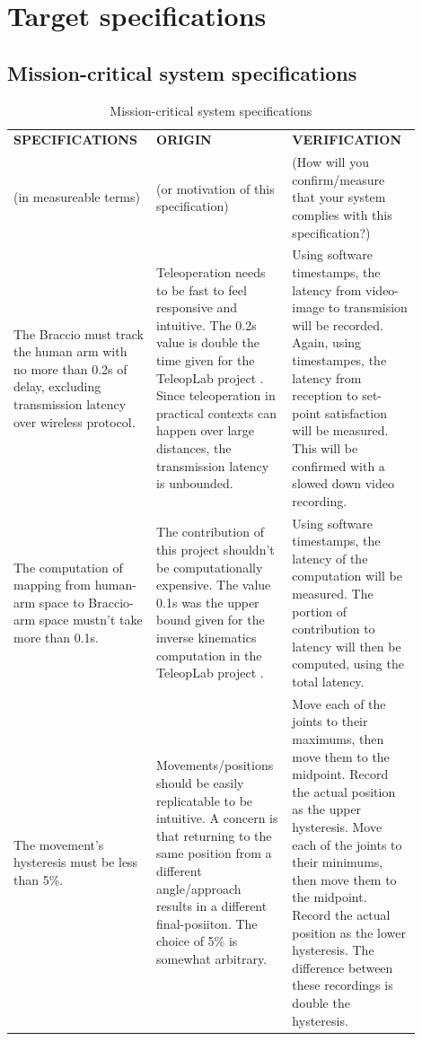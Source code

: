 \chapter{Target specifications}
\label{ch:target_specifications}

\section{Mission-critical system specifications}
\label{sec:mission_critical}

\begin{table}[h!]
\center
\begin{tabular}{|p{0.3\linewidth}|p{0.3\linewidth}|p{0.3\linewidth}|}
    \hline
    \textbf{SPECIFICATIONS} & \textbf{ORIGIN} & \textbf{VERIFICATION} \\
    (in measureable terms) & (or motivation of this specification) & (How will you confirm/measure that your system complies with this specification?) \\
    \hline
    The Braccio must track the human arm with no more than 0.2s of delay, excluding transmission latency over wireless protocol. & Teleoperation needs to be fast to feel responsive and intuitive. The 0.2s value is double the time given for the TeleopLab project \cite{bib:teleoperation_TeleopLab}. Since teleoperation in practical contexts can happen over large distances, the transmission latency is unbounded. & Using software timestamps, the latency from video-image to transmision will be recorded. Again, using timestampes, the latency from reception to set-point satisfaction will be measured. This will be confirmed with a slowed down video recording. \\
    \hline
    The computation of mapping from human-arm space to Braccio-arm space mustn't take more than 0.1s. & The contribution of this project shouldn't be computationally expensive. The value 0.1s was the upper bound given for the inverse kinematics computation in the TeleopLab project \cite{bib:teleoperation_TeleopLab}. & Using software timestamps, the latency of the computation will be measured. The portion of contribution to latency will then be computed, using the total latency. \\
    \hline
    The movement's hysteresis must be less than 5\%. & Movements/positions should be easily replicatable to be intuitive. A concern is that returning to the same position from a different angle/approach results in a different final-posiiton. The choice of 5\% is somewhat arbitrary. & Move each of the joints to their maximums, then move them to the midpoint. Record the actual position as the upper hysteresis. Move each of the joints to their minimums, then move them to the midpoint. Record the actual position as the lower hysteresis. The difference between these recordings is double the hysteresis. \\
    \hline
\end{tabular}
\caption{Mission-critical system specifications}
\end{table}

